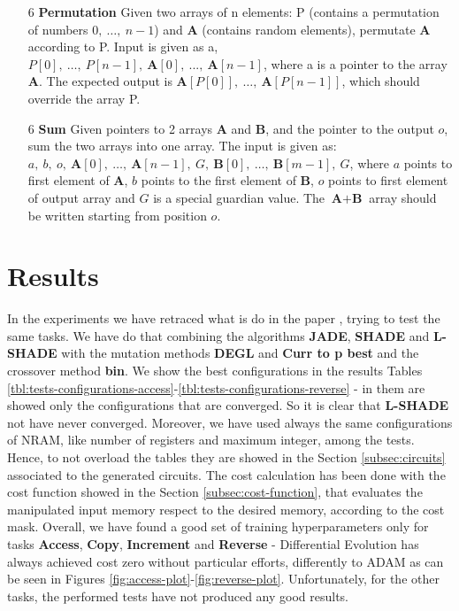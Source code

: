 \begin{itemize}
	\item[6]{\textbf{Permutation} Given two arrays of n elements: P (contains a permutation of numbers $0,\ \dots,\ n-1$) and \textbf{A} (contains random elements), permutate \textbf{A} according to P. Input is given as a, $P[0],\ \dots,\ P[n-1],\ \textbf{A}[0],\ ...,\ \textbf{A}[n-1]$, where a is a pointer to the array \textbf{A}. The expected output is $\textbf{A}[P[0]],\ \dots,\ \textbf{A}[P[n-1]]$, which should override the array P.}
	\item[6]{\textbf{Sum} Given pointers to 2 arrays \textbf{A} and \textbf{B}, and the pointer to the output $o$, sum the two arrays into one array. The input is given as: $a,\ b,\ o,\ \textbf{A}[0],\ \dots,\ \textbf{A}[n-1],\ G,\ \textbf{B}[0],\ \dots,\ \textbf{B}[m-1],\ G$, where $a$ points to first element of \textbf{A}, $b$ points to the first element of \textbf{B}, $o$ points to first element of output array and $G$ is a special guardian value. The $\textbf{A}+\textbf{B}$ array should be written starting from position $o$.}
\end{itemize}

\section{Results}
In the experiments we have retraced what is do in the paper \cite{NRAM:2016}, trying to test the same tasks. We have do that combining the algorithms \textbf{JADE}, \textbf{SHADE} and \textbf{L-SHADE} with the mutation methods \textbf{DEGL} and \textbf{Curr to p best} and the crossover method \textbf{bin}. We show the best configurations in the results Tables \ref{tbl:tests-configurations-access}-\ref{tbl:tests-configurations-reverse} - in them are showed only the configurations that are converged. So it is clear that \textbf{L-SHADE} not have never converged. Moreover, we have used always the same configurations of NRAM, like number of registers and maximum integer, among the tests. Hence, to not overload the tables they are showed in the Section \ref{subsec:circuits} associated to the generated circuits. The cost calculation has been done with the cost function showed in the Section \ref{subsec:cost-function}, that evaluates the manipulated input memory respect to the desired memory, according to the cost mask.\newline\newline
Overall, we have found a good set of training hyperparameters only for tasks \textbf{Access}, \textbf{Copy}, \textbf{Increment} and \textbf{Reverse} - Differential Evolution has always achieved cost zero without particular efforts, differently to ADAM as can be seen in Figures \ref{fig:access-plot}-\ref{fig:reverse-plot}. Unfortunately, for the other tasks, the performed tests have not produced any good results.\newline

